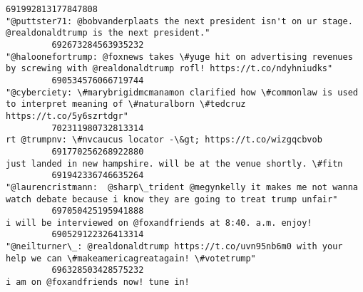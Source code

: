 \documentclass[11pt]{article}
\begin{document}
\begin{Verbatim}[commandchars=\\\{\}]
         691992813177847808                                                                                                                                                                             "@puttster71: @bobvanderplaats the next president isn't on ur stage. @realdonaldtrump is the next president."   
         692673284563935232                                                                                                                                                      "@haloonefortrump: @foxnews takes \#yuge hit on advertising revenues by screwing with @realdonaldtrump rofl! https://t.co/ndyhniudks"   
         690534576066719744                                                                                                                                                "@cyberciety: \#marybrigidmcmanamon clarified how \#commonlaw is used to interpret meaning of \#naturalborn \#tedcruz https://t.co/5y6szrtdgr"   
         702311980732813314                                                                                                                                                                                                                              rt @trumpnv: \#nvcaucus locator -\&gt; https://t.co/wizgqcbvob   
         691770256268922880                                                                                                                                                                                                                         just landed in new hampshire. will be at the venue shortly. \#fitn   
         691942336746635264                                                                                                                                                    "@laurencristmann:  @sharp\_trident @megynkelly it makes me not wanna watch debate because i know they are going to treat trump unfair"   
         697050425195941888                                                                                                                                                                                                                              i will be interviewed on @foxandfriends at 8:40. a.m. enjoy!   
         690529122326413314                                                                                                                                                                         "@neilturner\_: @realdonaldtrump https://t.co/uvn95nb6m0 with your help we can \#makeamericagreatagain! \#votetrump"   
         696328503428575232                                                                                                                                                                                                                                                      i am on @foxandfriends now! tune in!   

\end{Verbatim}
\end{document}
